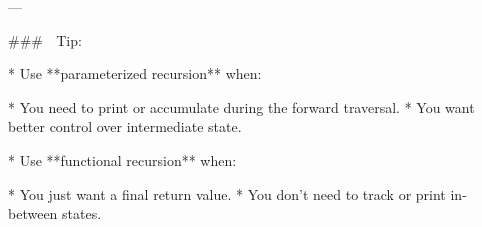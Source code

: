 ---

### 🧠 Tip:

* Use **parameterized recursion** when:

  * You need to print or accumulate during the forward traversal.
  * You want better control over intermediate state.
  
* Use **functional recursion** when:

  * You just want a final return value.
  * You don’t need to track or print in-between states.


